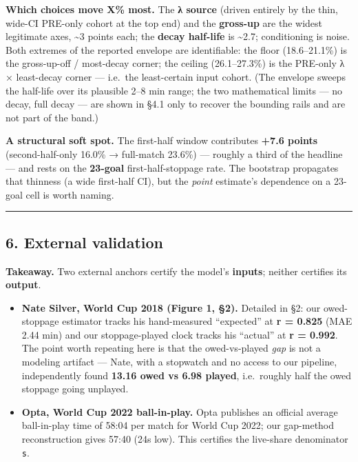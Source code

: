 \documentclass[
]{article}
\providecommand{\tightlist}{%
  \setlength{\itemsep}{0pt}\setlength{\parskip}{0pt}}
\begin{document}
\textbf{Which choices move X\% most.} The \textbf{λ source} (driven
entirely by the thin, wide-CI PRE-only cohort at the top end) and the
\textbf{gross-up} are the widest legitimate axes, \textasciitilde3
points each; the \textbf{decay half-life} is \textasciitilde2.7;
conditioning is noise. Both extremes of the reported envelope are
identifiable: the floor (18.6--21.1\%) is the gross-up-off / most-decay
corner; the ceiling (26.1--27.3\%) is the PRE-only λ × least-decay
corner --- i.e.~the least-certain input cohort. (The envelope sweeps the
half-life over its plausible 2--8 min range; the two mathematical limits
--- no decay, full decay --- are shown in §4.1 only to recover the
bounding rails and are not part of the band.)

\textbf{A structural soft spot.} The first-half window contributes
\textbf{+7.6 points} (second-half-only 16.0\% → full-match 23.6\%) ---
roughly a third of the headline --- and rests on the \textbf{23-goal}
first-half-stoppage rate. The bootstrap propagates that thinness (a wide
first-half CI), but the \emph{point} estimate's dependence on a 23-goal
cell is worth naming.

\begin{center}\rule{0.5\linewidth}{0.5pt}\end{center}

\subsection{6. External validation}\label{external-validation}

\textbf{Takeaway.} Two external anchors certify the model's
\textbf{inputs}; neither certifies its \textbf{output}.

\begin{itemize}
\tightlist
\item
  \textbf{Nate Silver, World Cup 2018 (Figure 1, §2).} Detailed in §2:
  our owed-stoppage estimator tracks his hand-measured ``expected'' at
  \textbf{r = 0.825} (MAE 2.44 min) and our stoppage-played clock tracks
  his ``actual'' at \textbf{r = 0.992}. The point worth repeating here
  is that the owed-vs-played \emph{gap} is not a modeling artifact ---
  Nate, with a stopwatch and no access to our pipeline, independently
  found \textbf{13.16 owed vs 6.98 played}, i.e.~roughly half the owed
  stoppage going unplayed.
\item
  \textbf{Opta, World Cup 2022 ball-in-play.} Opta publishes an official
  average ball-in-play time of 58:04 per match for World Cup 2022; our
  gap-method reconstruction gives 57:40 (24s low). This certifies the
  live-share denominator \texttt{s}.
\end{itemize}
\end{document}
